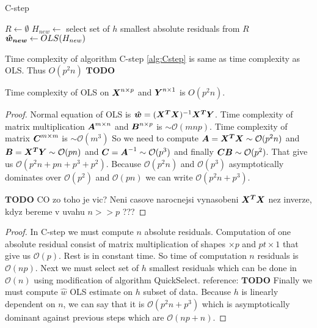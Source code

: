 \begin{algorithm}[H]
	\label{alg:Cstep}
	\caption{C-step}
	
	$R \gets \emptyset$\;
	$H_{new} \gets $ select set of $h$ smallest absolute residuals from $R$\;
	$\boldsymbol{\hat{w}_{new}} \gets OLS(H_{new})$\;
	\;
\end{algorithm}

\begin{observation} 
	Time complexity of algorithm C-step \ref{alg:Cstep} is same as time complexity as OLS. Thus $O(p^2n)$
	$\boldsymbol{{TODO}}$
\end{observation} 

\begin{lemma}
	Time complexity of OLS  on $\m{X}^{n \times p}$ and $\m{Y}^{n \times 1}$ is $O(p^2n)$.
\end{lemma}

\begin{proof}
	Normal equation of OLS is $\vec{\hat{w}} = (\m{X^T}\m{X})^{-1}\m{X^T}\m{Y}$.
	Time complexity  of matrix multiplication $\m{A}^{m \times n}$ and  $\m{B}^{n \times p}$ is $\sim \mathcal{O}(mnp)$.
	Time complexity of matrix $\m{C}^{m \times m}$ is $\sim \mathcal{O}(m^3)$
	So we need to compute 
	$\m{A} = \m{X^T}\m{X} \sim \mathcal{O}(p^2n)$ and
	$\m{B} = \m{X^T}\m{Y} \sim \mathcal{O}(pn)$ and
	$\m{C} = \m{A}^{-1} \sim \mathcal{O}(p^3)$ and finally 
	$\m{C}\m{B} \sim \mathcal{O}(p^2)$. 
	That give us $\mathcal{O}(p^2n + pn + p^3 + p^2)$. Because  $\mathcal{O}(p^2n)$ and 
	$\mathcal{O}(p^3)$ asymptotically dominates over $\mathcal{O}(p^2)$ and $\mathcal{O}(pn)$ we can
	write $\mathcal{O}(p^2n + p^3)$.

	$\boldsymbol{{TODO}}$ CO zo toho je vic? Neni casove narocnejsi vynasobeni $\m{X^T}\m{X}$ nez inverze, kdyz bereme v uvahu $n >> p$ ???
\end{proof}

\begin{proof}
	In C-step we must compute $n$ absolute residuals. Computation of one absolute residual consist of
	matrix multiplication of shapes $ \times p$ and $p t\times 1$ that give us $\mathcal{O}(p)$. Rest is in constant time.
	So time of computation $n$ residuals is $\mathcal{O}(np)$.
	Next we must select set of $h$ smallest residuals which can be done in $\mathcal{O}(n)$ using modification 
	of algorithm QuickSelect. reference: $\boldsymbol{{TODO}}$
	Finally we must compute $\hat{w}$ OLS estimate on $h$ subset of data.
	Because $h$ is linearly dependent on $n$, we can say that it is $\mathcal{O}(p^2n + p^3)$ which 
	is asymptotically dominant against previous steps which are $\mathcal{O}(np + n)$.
\end{proof}

